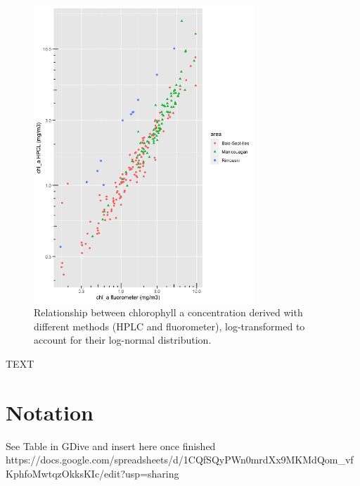 \documentclass[essd, manuscript]{copernicus}
\begin{document}
\begin{figure}[t]
    \includegraphics[width=8.3cm]{Figures/fig_regression_chla.png}
    \caption{Relationship between chlorophyll a concentration derived with different methods (HPLC and fluorometer), log-transformed to account for their log-normal distribution. }
    \label{fig:chlareg}
\end{figure}
\conclusions  %
TEXT












\appendix
\section{Notation}    %
See Table in GDive and insert here once finished
https://docs.google.com/spreadsheets/d/1CQfSQyPWn0mrdXx9MKMdQom\_vfKphfoMwtqzOkksKIc/edit?usp=sharing
\end{document}
